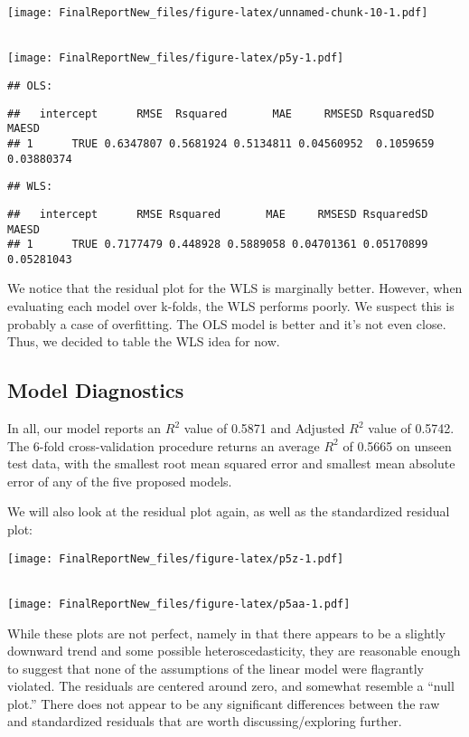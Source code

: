 \documentclass[]{article}
\begin{document}
\texttt{[image: FinalReportNew\_files/figure-latex/unnamed-chunk-10-1.pdf]}

\\
\texttt{[image: FinalReportNew\_files/figure-latex/p5y-1.pdf]}

\begin{verbatim}
## OLS:
\end{verbatim}

\begin{verbatim}
##   intercept      RMSE  Rsquared       MAE     RMSESD RsquaredSD      MAESD
## 1      TRUE 0.6347807 0.5681924 0.5134811 0.04560952  0.1059659 0.03880374
\end{verbatim}

\begin{verbatim}
## WLS:
\end{verbatim}

\begin{verbatim}
##   intercept      RMSE Rsquared       MAE     RMSESD RsquaredSD      MAESD
## 1      TRUE 0.7177479 0.448928 0.5889058 0.04701361 0.05170899 0.05281043
\end{verbatim}

We notice that the residual plot for the WLS is marginally better.
However, when evaluating each model over k-folds, the WLS performs
poorly. We suspect this is probably a case of overfitting. The OLS model
is better and it's not even close. Thus, we decided to table the WLS
idea for now.

\subsection{Model Diagnostics}\label{model-diagnostics}

In all, our model reports an \(R^2\) value of 0.5871 and Adjusted
\(R^2\) value of 0.5742. The 6-fold cross-validation procedure returns
an average \(R^2\) of 0.5665 on unseen test data, with the smallest root
mean squared error and smallest mean absolute error of any of the five
proposed models.

We will also look at the residual plot again, as well as the
standardized residual plot:

\texttt{[image: FinalReportNew\_files/figure-latex/p5z-1.pdf]}

\\
\texttt{[image: FinalReportNew\_files/figure-latex/p5aa-1.pdf]}

While these plots are not perfect, namely in that there appears to be a
slightly downward trend and some possible heteroscedasticity, they are
reasonable enough to suggest that none of the assumptions of the linear
model were flagrantly violated. The residuals are centered around zero,
and somewhat resemble a ``null plot.'' There does not appear to be any
significant differences between the raw and standardized residuals that
are worth discussing/exploring further.
\end{document}

